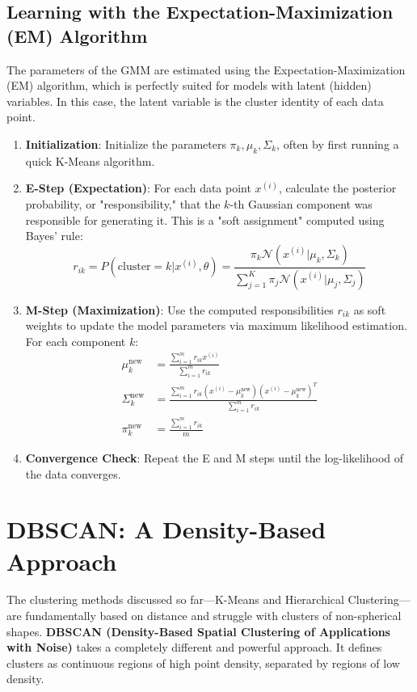 \subsection*{Learning with the Expectation-Maximization (EM) Algorithm}
The parameters of the GMM are estimated using the Expectation-Maximization (EM) algorithm, which is perfectly suited for models with latent (hidden) variables. In this case, the latent variable is the cluster identity of each data point.
\begin{enumerate}
    \item \textbf{Initialization}: Initialize the parameters $\pi_k, \mu_k, \Sigma_k$, often by first running a quick K-Means algorithm.
    \item \textbf{E-Step (Expectation)}: For each data point $x^{(i)}$, calculate the posterior probability, or "responsibility," that the $k$-th Gaussian component was responsible for generating it. This is a "soft assignment" computed using Bayes' rule:
    $$ r_{ik} = P(\text{cluster}=k | x^{(i)}, \theta) = \frac{\pi_k \mathcal{N}(x^{(i)} | \mu_k, \Sigma_k)}{\sum_{j=1}^{K} \pi_j \mathcal{N}(x^{(i)} | \mu_j, \Sigma_j)} $$
    \item \textbf{M-Step (Maximization)}: Use the computed responsibilities $r_{ik}$ as soft weights to update the model parameters via maximum likelihood estimation. For each component $k$:
    \begin{align*}
        \mu_k^{\text{new}} &= \frac{\sum_{i=1}^{m} r_{ik} x^{(i)}}{\sum_{i=1}^{m} r_{ik}} \\
        \Sigma_k^{\text{new}} &= \frac{\sum_{i=1}^{m} r_{ik} (x^{(i)} - \mu_k^{\text{new}})(x^{(i)} - \mu_k^{\text{new}})^T}{\sum_{i=1}^{m} r_{ik}} \\
        \pi_k^{\text{new}} &= \frac{\sum_{i=1}^{m} r_{ik}}{m}
    \end{align*}
    \item \textbf{Convergence Check}: Repeat the E and M steps until the log-likelihood of the data converges.
\end{enumerate}

\section{DBSCAN: A Density-Based Approach}
\label{sec:dbscan}
The clustering methods discussed so far—K-Means and Hierarchical Clustering—are fundamentally based on distance and struggle with clusters of non-spherical shapes. \textbf{DBSCAN (Density-Based Spatial Clustering of Applications with Noise)} takes a completely different and powerful approach. It defines clusters as continuous regions of high point density, separated by regions of low density.

